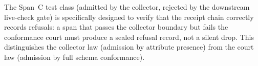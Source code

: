 The Span~C test class (admitted by the collector, rejected by the downstream live-check gate)
is specifically designed to verify that the receipt chain correctly records refusals: a span
that passes the collector boundary but fails the conformance court must produce a sealed
refusal record, not a silent drop. This distinguishes the collector law (admission by
attribute presence) from the court law (admission by full schema conformance).
